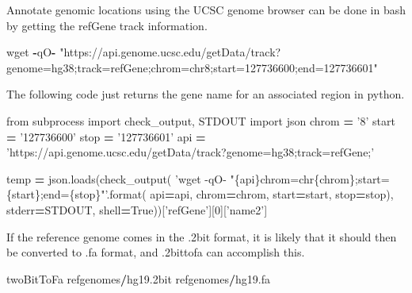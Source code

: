 \documentclass[]{book}
\newenvironment{Shaded}{\begin{snugshade}}{\end{snugshade}}
\newcommand{\BuiltInTok}[1]{#1}
\newcommand{\DecValTok}[1]{\textcolor[rgb]{0.00,0.00,0.81}{#1}}
\newcommand{\FloatTok}[1]{\textcolor[rgb]{0.00,0.00,0.81}{#1}}
\newcommand{\ImportTok}[1]{#1}
\newcommand{\NormalTok}[1]{#1}
\newcommand{\OperatorTok}[1]{\textcolor[rgb]{0.81,0.36,0.00}{\textbf{#1}}}
\newcommand{\SpecialCharTok}[1]{\textcolor[rgb]{0.00,0.00,0.00}{#1}}
\newcommand{\StringTok}[1]{\textcolor[rgb]{0.31,0.60,0.02}{#1}}
\newcommand{\VariableTok}[1]{\textcolor[rgb]{0.00,0.00,0.00}{#1}}
\begin{document}
Annotate genomic locations using the UCSC genome browser can be done in bash by getting the refGene track information.

\begin{Shaded}
\begin{Highlighting}[]
\NormalTok{wget }\OperatorTok{-}\NormalTok{qO}\OperatorTok{-} \StringTok{"https://api.genome.ucsc.edu/getData/track?genome=hg38;track=refGene;chrom=chr8;start=127736600;end=127736601"}
\end{Highlighting}
\end{Shaded}

The following code just returns the gene name for an associated region in python.

\begin{Shaded}
\begin{Highlighting}[]
\ImportTok{from}\NormalTok{ subprocess }\ImportTok{import}\NormalTok{ check_output, STDOUT}
\ImportTok{import}\NormalTok{ json}
\NormalTok{chrom }\OperatorTok{=} \StringTok{'8'}
\NormalTok{start }\OperatorTok{=} \StringTok{'127736600'}
\NormalTok{stop }\OperatorTok{=} \StringTok{'127736601'}
\NormalTok{api }\OperatorTok{=} \StringTok{'https://api.genome.ucsc.edu/getData/track?genome=hg38;track=refGene;'}

\NormalTok{temp }\OperatorTok{=}\NormalTok{ json.loads(check_output(}
    \StringTok{'wget -qO- "}\SpecialCharTok{\{api\}}\StringTok{chrom=chr}\SpecialCharTok{\{chrom\}}\StringTok{;start=}\SpecialCharTok{\{start\}}\StringTok{;end=}\SpecialCharTok{\{stop\}}\StringTok{"'}\NormalTok{.}\BuiltInTok{format}\NormalTok{(}
\NormalTok{        api}\OperatorTok{=}\NormalTok{api, chrom}\OperatorTok{=}\NormalTok{chrom, start}\OperatorTok{=}\NormalTok{start, stop}\OperatorTok{=}\NormalTok{stop),}
\NormalTok{        stderr}\OperatorTok{=}\NormalTok{STDOUT, shell}\OperatorTok{=}\VariableTok{True}\NormalTok{))[}\StringTok{'refGene'}\NormalTok{][}\DecValTok{0}\NormalTok{][}\StringTok{'name2'}\NormalTok{]}
\end{Highlighting}
\end{Shaded}

If the reference genome comes in the .2bit format, it is likely that it should then be converted to .fa format, and .2bittofa can accomplish this.

\begin{Shaded}
\begin{Highlighting}[]
\NormalTok{twoBitToFa refgenomes}\OperatorTok{/}\NormalTok{hg19}\FloatTok{.2}\NormalTok{bit refgenomes}\OperatorTok{/}\NormalTok{hg19.fa}
\end{Highlighting}
\end{Shaded}
\end{document}
